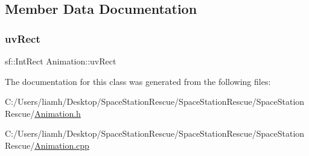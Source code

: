 \subsection{Member Data Documentation}
\mbox{\label{class_animation_a82c41dd15d9a98ecc0699ecca09fd056}} 
\subsubsection{\texorpdfstring{uvRect}{uvRect}}
{\footnotesize\ttfamily sf\+::\+Int\+Rect Animation\+::uv\+Rect}



The documentation for this class was generated from the following files\+:\begin{DoxyCompactItemize}
\item 
C\+:/\+Users/liamh/\+Desktop/\+Space\+Station\+Rescue/\+Space\+Station\+Rescue/\+Space\+Station\+Rescue/\mbox{\hyperlink{_animation_8h}{Animation.\+h}}\item 
C\+:/\+Users/liamh/\+Desktop/\+Space\+Station\+Rescue/\+Space\+Station\+Rescue/\+Space\+Station\+Rescue/\mbox{\hyperlink{_animation_8cpp}{Animation.\+cpp}}\end{DoxyCompactItemize}
